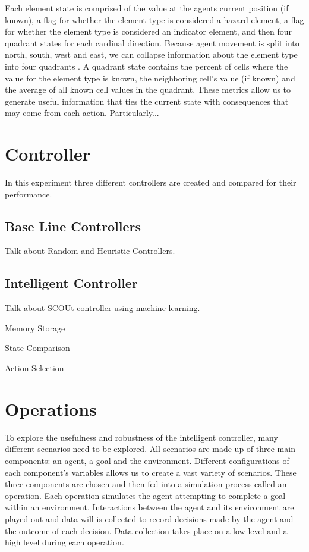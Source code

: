Each element state is comprised of the value at the agents current position (if known), a flag for whether the element type is considered a hazard element, a flag for whether the element type is considered an indicator element, and then four quadrant states for each cardinal direction.
Because agent movement is split into north, south, west and east, we can collapse information about the element type into four quadrants .
A quadrant state contains the percent of cells where the value for the element type is known, the neighboring cell's value (if known) and the average of all known cell values in the quadrant.
These metrics allow us to generate useful information that ties the current state with consequences that may come from each action.
Particularly...



\section{Controller}
In this experiment three different controllers are created and compared for their performance.

\subsection{Base Line Controllers}
Talk about Random and Heuristic Controllers.

\subsection{Intelligent Controller}
Talk about SCOUt controller using machine learning.

Memory Storage

State Comparison

Action Selection



\section{Operations}
To explore the usefulness and robustness of the intelligent controller, many different scenarios need to be explored.
All scenarios are made up of three main components: an agent, a goal and the environment.
Different configurations of each component's variables allows us to create a vast variety of scenarios.
These three components are chosen and then fed into a simulation process called an operation. 
Each operation simulates the agent attempting to complete a goal within an environment.
Interactions between the agent and its environment are played out and data will is collected to record decisions made by the agent and the outcome of each decision.
Data collection takes place on a low level and a high level during each operation.

